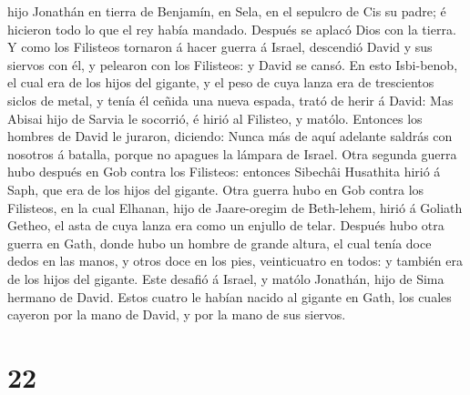 hijo Jonathán en tierra de Benjamín, en Sela, en el sepulcro de Cis su
padre; é hicieron todo lo que el rey había mandado. Después se aplacó
Dios con la tierra.  Y como los Filisteos tornaron á hacer
guerra á Israel, descendió David y sus siervos con él, y pelearon con
los Filisteos: y David se cansó.  En esto Isbi-benob, el
cual era de los hijos del gigante, y el peso de cuya lanza era de
trescientos siclos de metal, y tenía él ceñida una nueva espada, trató
de herir á David:  Mas Abisai hijo de Sarvia le socorrió, é
hirió al Filisteo, y matólo. Entonces los hombres de David le juraron,
diciendo: Nunca más de aquí adelante saldrás con nosotros á batalla,
porque no apagues la lámpara de Israel.  Otra segunda
guerra hubo después en Gob contra los Filisteos: entonces Sibechâi
Husathita hirió á Saph, que era de los hijos del gigante. 
Otra guerra hubo en Gob contra los Filisteos, en la cual Elhanan, hijo
de Jaare-oregim de Beth-lehem, hirió á Goliath Getheo, el asta de cuya
lanza era como un enjullo de telar.  Después hubo otra
guerra en Gath, donde hubo un hombre de grande altura, el cual tenía
doce dedos en las manos, y otros doce en los pies, veinticuatro en
todos: y también era de los hijos del gigante.  Este
desafió á Israel, y matólo Jonathán, hijo de Sima hermano de David.
 Estos cuatro le habían nacido al gigante en Gath, los
cuales cayeron por la mano de David, y por la mano de sus siervos.

\hypertarget{section-21}{%
\section{22}\label{section-21}}

